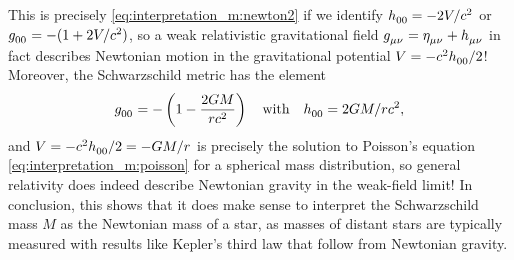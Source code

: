 This is precisely \cref{eq:interpretation_m:newton2} if we identify $h\indices{_0_0} = -2V/c^2$ or $g\indices{_0_0} = -(1+2V/c^2)$, so a weak relativistic gravitational field $g\indices{_\mu_\nu} = \eta\indices{_\mu_\nu} + h\indices{_\mu_\nu}$ in fact describes Newtonian motion in the gravitational potential $V = -c^2 h\indices{_0_0} / 2$!
Moreover, the Schwarzschild metric has the element
\begin{equation}
	g\indices{_0_0} = - \left( 1 - \frac{2 G M}{r c^2} \right)
	\quad \text{with} \quad
	h\indices{_0_0} = 2GM/rc^2 ,
	\label{eq:weak_field_limit:schwarzschild_metric_tt}
\end{equation}
and $V = -c^2 h\indices{_0_0} / 2 = -G M / r$ is precisely the solution to Poisson's equation \eqref{eq:interpretation_m:poisson} for a spherical mass distribution, so general relativity does indeed describe Newtonian gravity in the weak-field limit!
In conclusion, this shows that it does make sense to interpret the Schwarzschild mass $M$ as the Newtonian mass of a star, as masses of distant stars are typically measured with results like Kepler's third law that follow from Newtonian gravity. \cite[box 23.1]{ref:mtw}


